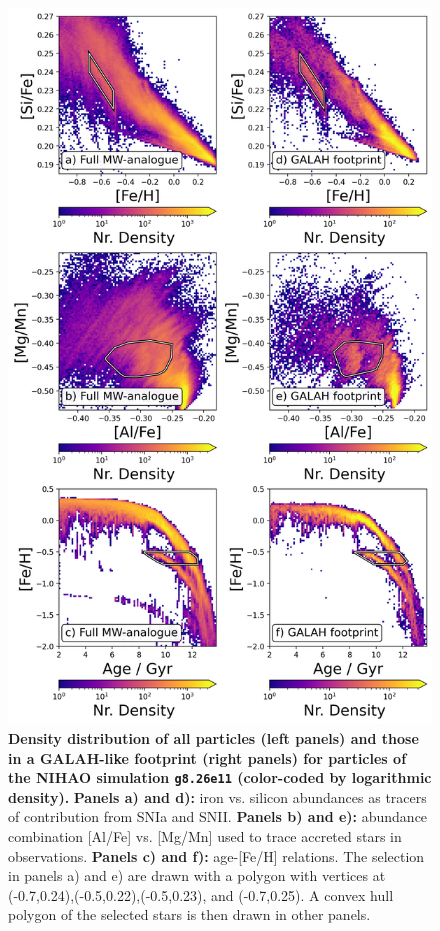\documentclass[fleqn,usenatbib]{mnras}
\begin{document}
\begin{figure}
	\includegraphics[width=\columnwidth]{figures/low_alpha_halo_convex_hull.png}
    \caption{
    \textbf{Density distribution of all particles (left panels) and those in a GALAH-like footprint (right panels) for particles of the NIHAO simulation \texttt{g8.26e11} (color-coded by logarithmic density).}
    \textbf{Panels a) and d):} iron vs. silicon abundances as tracers of contribution from SNIa and SNII. \textbf{Panels b) and e):} abundance combination [Al/Fe] vs. [Mg/Mn] used to trace accreted stars in observations.
    \textbf{Panels c) and f):} age-[Fe/H] relations.  
    The selection in panels a) and e) are drawn with a polygon with vertices at (-0.7,0.24),(-0.5,0.22),(-0.5,0.23), and (-0.7,0.25). A convex hull polygon of the selected stars is then drawn in other panels.}
    \label{fig:low_alpha_halo}
\end{figure}
\end{document}
